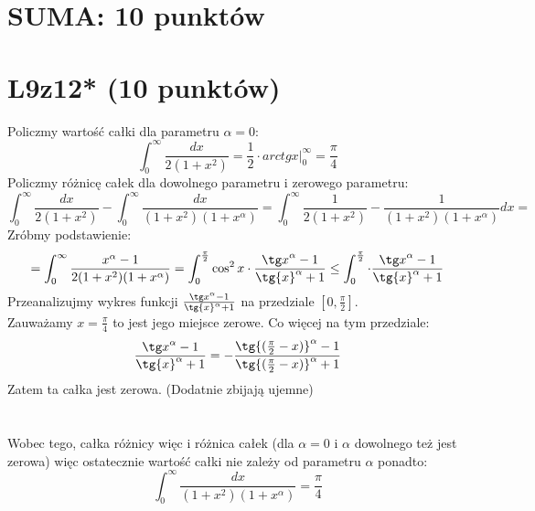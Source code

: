 \documentclass{article}
\title{}
\date{28.05.2020}
\author{Maurycy Borkowski}
\begin{document}
\maketitle

\section{SUMA: 10 punktów}
\section{L9z12* (10 punktów)}
Policzmy wartość całki dla parametru $\alpha = 0$:
$$
\int_0^\infty \frac{dx}{2(1+x^2)} = \frac{1}{2} \cdot arctg{x} |_0^\infty = \frac{\pi}{4}
$$
Policzmy różnicę całek dla dowolnego parametru i zerowego parametru:
$$
\int_0^\infty \frac{dx}{2(1+x^2)} - \int_0^\infty \frac{dx}{(1+x^2)(1+x^\alpha)} = \int_0^\infty \frac{1}{2(1+x^2)} - \frac{1}{(1+x^2)(1+x^\alpha)} dx =
$$
Zróbmy podstawienie:
$$
=\int_0^\infty \frac{x^\alpha - 1}{2(1+x^2)(1+x^\alpha)} = \int_0^{\frac{\pi}{2}} \cos^2{x} \cdot \frac{{\tg x}^\alpha - 1}{{\tg{x}}^\alpha + 1} \leq \int_0^{\frac{\pi}{2}} \cdot \frac{{\tg x}^\alpha - 1}{{\tg{x}}^\alpha + 1}
$$
Przeanalizujmy wykres funkcji $\frac{{\tg x}^\alpha - 1}{{\tg{x}}^\alpha + 1}$ na przedziale $[0,\frac{\pi}{2}]$.\\
Zauważamy $x = \frac{\pi}{4}$ to jest jego miejsce zerowe. Co więcej na tym przedziale:
$$
\frac{{\tg x}^\alpha - 1}{{\tg{x}}^\alpha + 1} = - \frac{\tg{(\frac{\pi}{2} - x)}^\alpha - 1}{{\tg{(\frac{\pi}{2} - x)}^\alpha + 1}}
$$
Zatem ta całka jest zerowa. (Dodatnie zbijają ujemne)\\\\\\
Wobec tego, całka różnicy więc i różnica całek (dla $\alpha = 0$ i $\alpha$ dowolnego też jest zerowa) więc ostatecznie wartość całki nie zależy od parametru $\alpha$ ponadto:
$$
\int_0^\infty \frac{dx}{(1+x^2)(1+x^\alpha)} = \frac{\pi}{4}
$$
\end{document}
